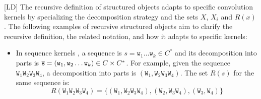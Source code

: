 \documentclass[twoside,11pt]{article}
\def\substr#1{{\bf\overline{#1}}}
\def\myremove#1{}
\def\myinsert#1{#1}
\def\LD#1{[{\color{blue}L}D] {\color{blue}#1}}
\begin{document}
\LD{The recursive definition of structured objects adapts to specific convolution kernels by 
specializing the decomposition strategy and 
the sets $X$, $X_i$ and $R(x)$.}
The following examples of recursive structured objects aim to clarify the recursive definition, the related notation, and how it adapts to specific kernels:
\begin{itemize}
\item
In sequence kernels \cite{Lodhi:2002:TCU:944790.944799}, a sequence is $s=\myremove{w_1 \ldots w_k}\myinsert{\texttt{w}_1 \ldots \texttt{w}_k} \in C^{*}$ and its  decomposition into parts is $\substr{s}=(\texttt{w}_1,\texttt{w}_2 \ldots \texttt{w}_k) \in C \times C^{*}$.  For example, given the sequence $\texttt{W}_1 \texttt{W}_2 \texttt{W}_3 \texttt{W}_4$, a decomposition into parts is $(\texttt{W}_1,\texttt{W}_2 \texttt{W}_3 \texttt{W}_4)$. The set $R(s)$ for the same sequence is:
$$
R(\texttt{W}_1 \texttt{W}_2 \texttt{W}_3 \texttt{W}_4) = \{(\texttt{W}_1,\texttt{W}_2 \texttt{W}_3 \texttt{W}_4), (\texttt{W}_2,\texttt{W}_3 \texttt{W}_4), (\texttt{W}_3,\texttt{W}_4)\}
$$


\end{itemize}
\end{document}
